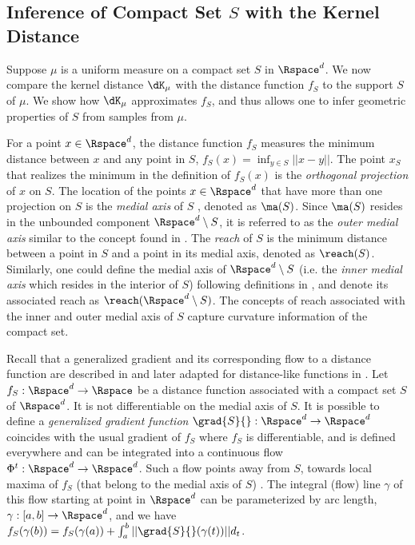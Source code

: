 \documentclass[11pt]{myclass}
\begin{document}
\subsection{Inference of Compact Set $S$ with the Kernel Distance}
\label{app:infer}

Suppose $\mu$ is a uniform measure on a compact set $S$ in $\Rspace^d$. 
We now compare the kernel distance $\dK_\mu$ with the distance function $f_S$ to the support $S$ of $\mu$. We show how $\dK_\mu$ approximates $f_S$, and thus allows one to infer geometric properties of $S$ from samples from $\mu$. 

For a point $x \in \Rspace^d$, the distance function $f_S$ measures the minimum distance between $x$ and any point in $S$, $f_S(x) = \inf_{y \in S}||x-y||$. 
The point $x_S$ that realizes the minimum in the definition of $f_S(x)$ is the \emph{orthogonal projection} of $x$ on $S$.  The location of the points $x \in \Rspace^d$ that have more than one projection on $S$ is the \emph{medial axis} of $S$ \cite{Merigot2010}, denoted as $\ma(S)$. Since $\ma(S)$ resides in the unbounded component $\Rspace^d \setminus S$, it is referred to as the \emph{outer medial axis} similar to the concept found in \cite{Dey2007}. The \emph{reach} of $S$ is the minimum distance between a point in $S$ and a point in its medial axis, denoted as $\reach(S)$. 
Similarly, one could define the medial axis of $\Rspace^d \setminus S$ (i.e. 
the \emph{inner medial axis} which resides in the interior of $S$) following definitions in \cite{Lieutier2004}, and denote its associated reach as $\reach(\Rspace^d \setminus S)$. The concepts of reach associated with the inner and outer medial axis of $S$ capture curvature information of the compact set. 


Recall that a generalized gradient and its corresponding flow to a distance function are described in \cite{ChazalCohen-SteinerLieutier2009} and later adapted for distance-like functions in \cite{ChazalCohen-SteinerMerigot2011}. 
Let $f_S: \Rspace^d \to \Rspace$ be a distance function associated with a compact set $S$ of $\Rspace^d$. 
It is not differentiable on the medial axis of $S$. 
It is possible to define a \emph{generalized gradient function} $\grad{S}{}: \Rspace^d \to \Rspace^d$ coincides with the usual gradient of $f_S$ where $f_S$ is differentiable, and is defined everywhere and can be integrated into a continuous flow $\Phi^t: \Rspace^d \to \Rspace^d$.   
Such a flow points away from $S$, towards local maxima of $f_S$ (that belong to the medial axis of $S$) \cite{Merigot2010}. 
The integral (flow) line $\gamma$ of this flow starting at point in $\Rspace^d$ can be parameterized by arc length, $\gamma: [a, b] \to \Rspace^d$, and we have $f_S(\gamma(b)) = f_S(\gamma(a)) + \int_{a}^{b}||\grad{S}{}(\gamma(t))|| d_t$.
\end{document}
